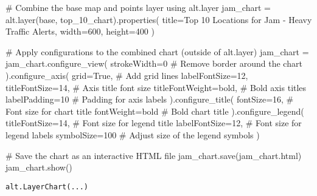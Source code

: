 \documentclass[
  letterpaper,
  DIV=11,
  numbers=noendperiod]{scrartcl}
\newenvironment{Shaded}{\begin{snugshade}}{\end{snugshade}}
\newcommand{\CommentTok}[1]{\textcolor[rgb]{0.37,0.37,0.37}{#1}}
\newcommand{\DecValTok}[1]{\textcolor[rgb]{0.68,0.00,0.00}{#1}}
\newcommand{\NormalTok}[1]{\textcolor[rgb]{0.00,0.23,0.31}{#1}}
\newcommand{\OperatorTok}[1]{\textcolor[rgb]{0.37,0.37,0.37}{#1}}
\newcommand{\StringTok}[1]{\textcolor[rgb]{0.13,0.47,0.30}{#1}}
\newcommand{\VariableTok}[1]{\textcolor[rgb]{0.07,0.07,0.07}{#1}}
\begin{document}
\begin{Shaded}
\begin{Highlighting}[]
\CommentTok{\# Combine the base map and points layer using alt.layer}
\NormalTok{jam\_chart }\OperatorTok{=}\NormalTok{ alt.layer(base, top\_10\_chart).properties(}
\NormalTok{    title}\OperatorTok{=}\StringTok{\textquotesingle{}Top 10 Locations for Jam {-} Heavy Traffic Alerts\textquotesingle{}}\NormalTok{,}
\NormalTok{    width}\OperatorTok{=}\DecValTok{600}\NormalTok{,}
\NormalTok{    height}\OperatorTok{=}\DecValTok{400}
\NormalTok{)}

\CommentTok{\# Apply configurations to the combined chart (outside of alt.layer)}
\NormalTok{jam\_chart }\OperatorTok{=}\NormalTok{ jam\_chart.configure\_view(}
\NormalTok{    strokeWidth}\OperatorTok{=}\DecValTok{0}  \CommentTok{\# Remove border around the chart}
\NormalTok{).configure\_axis(}
\NormalTok{    grid}\OperatorTok{=}\VariableTok{True}\NormalTok{,  }\CommentTok{\# Add grid lines}
\NormalTok{    labelFontSize}\OperatorTok{=}\DecValTok{12}\NormalTok{,}
\NormalTok{    titleFontSize}\OperatorTok{=}\DecValTok{14}\NormalTok{,  }\CommentTok{\# Axis title font size}
\NormalTok{    titleFontWeight}\OperatorTok{=}\StringTok{\textquotesingle{}bold\textquotesingle{}}\NormalTok{,  }\CommentTok{\# Bold axis titles}
\NormalTok{    labelPadding}\OperatorTok{=}\DecValTok{10}  \CommentTok{\# Padding for axis labels}
\NormalTok{).configure\_title(}
\NormalTok{    fontSize}\OperatorTok{=}\DecValTok{16}\NormalTok{,  }\CommentTok{\# Font size for chart title}
\NormalTok{    fontWeight}\OperatorTok{=}\StringTok{\textquotesingle{}bold\textquotesingle{}}  \CommentTok{\# Bold chart title}
\NormalTok{).configure\_legend(}
\NormalTok{    titleFontSize}\OperatorTok{=}\DecValTok{14}\NormalTok{,  }\CommentTok{\# Font size for legend title}
\NormalTok{    labelFontSize}\OperatorTok{=}\DecValTok{12}\NormalTok{,  }\CommentTok{\# Font size for legend labels}
\NormalTok{    symbolSize}\OperatorTok{=}\DecValTok{100}  \CommentTok{\# Adjust size of the legend symbols}
\NormalTok{)}
\end{Highlighting}
\end{Shaded}

\begin{Shaded}
\begin{Highlighting}[]
\CommentTok{\# Save the chart as an interactive HTML file}
\NormalTok{jam\_chart.save(}\StringTok{\textquotesingle{}jam\_chart.html\textquotesingle{}}\NormalTok{)}
\NormalTok{jam\_chart.show()}
\end{Highlighting}
\end{Shaded}

\begin{verbatim}
alt.LayerChart(...)
\end{verbatim}
\end{document}
